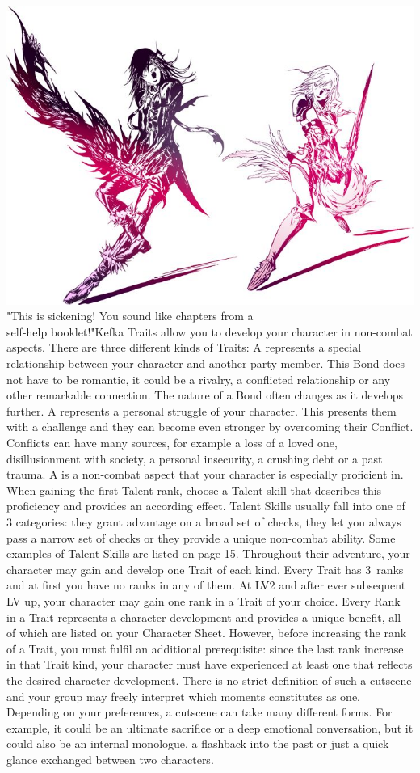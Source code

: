 %
\vfill
%
\includegraphics[width=\columnwidth]{./art/images/ff13-2.jpg}
%
\vfill
%
{"This is sickening! You sound like chapters from a\\ self-help booklet!"}{Kefka}{
Traits allow you to develop your character in non-combat aspects.
There are three different kinds of Traits:\ofrow
A  represents a special relationship between your character and another party member.
This Bond does not have to be romantic, it could be a rivalry, a conflicted relationship or any other remarkable connection.
The nature of a Bond often changes as it develops further.\ofrow
A  represents a personal struggle of your character.
This presents them with a challenge and they can become even stronger by overcoming their Conflict.
Conflicts can have many sources, for example a loss of a loved one, disillusionment with society, a personal insecurity, a crushing debt or a past trauma.\ofrow
A  is a non-combat aspect that your character is especially proficient in.
When gaining the first Talent rank, choose a Talent skill that describes this proficiency and provides an according effect.
Talent Skills usually fall into one of 3 categories: they grant advantage on a broad set of checks, they let you always pass a narrow set of checks or they provide a unique non-combat ability.
Some examples of Talent Skills are listed on page 15.
%
\newpage
%
Throughout their adventure, your character may gain and develop one Trait of each kind.
Every Trait has 3~ranks and at first you have no ranks in any of them.
At LV2 and after ever subsequent LV up, your character may gain one rank in a Trait of your choice.
Every Rank in a Trait represents a character development and provides a unique benefit, all of which are listed on your Character Sheet.
However, before increasing the rank of a Trait, you must fulfil an additional prerequisite: 
since the last rank increase in that Trait kind, your character must have experienced at least one  that reflects the desired character development.
There is no strict definition of such a cutscene and your group may freely interpret which moments constitutes as one.
Depending on your preferences, a cutscene can take many different forms. 
For example, it could be an ultimate sacrifice or a deep emotional conversation, but it could also be an internal monologue, a flashback into the past or just a quick glance exchanged between two characters.}
